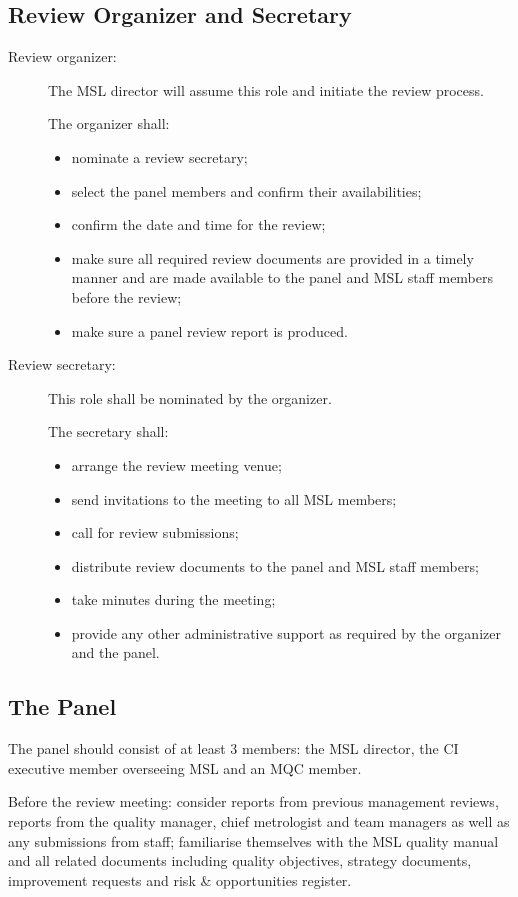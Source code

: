 \subsection{Review Organizer and Secretary}
\begin{description}
\item[Review organizer: ]The MSL director will assume this role and initiate the review process.

The organizer shall: 
\begin{itemize}
\item nominate a review secretary;
\item select the panel members and confirm
their availabilities;
\item confirm the date and time for the review;
\item make sure all required review
documents are provided in a timely manner and are made available to the panel and MSL
staff members before the review;
\item   make sure a panel review report is produced.
\end{itemize}  
\item[Review secretary: ] This role shall be nominated by the organizer. 

The secretary shall: 
\begin{itemize}
\item arrange the review meeting venue;
\item send invitations to the meeting to all MSL members;
\item call for review submissions;
\item distribute review documents to the panel and MSL staff members;
\item take minutes during the meeting;
\item  provide any other administrative support as required by the organizer and the panel.
\end{itemize}   
\end{description} 

\subsection{The Panel}
The panel should consist of at least 3 members: the MSL director, the CI executive member
overseeing MSL and an MQC member.

Before the review meeting: consider reports from previous management reviews, reports
from the quality manager, chief metrologist and team managers as well as any submissions
from staff; familiarise themselves with the MSL quality manual and all related documents
including quality objectives, strategy documents, improvement requests and risk \& opportunities register.

